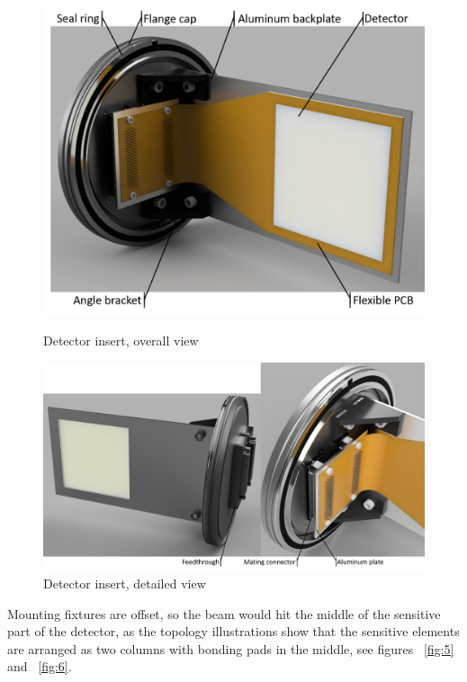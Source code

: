 \documentclass[a4paper]{jpconf}
\begin{document}
\begin{figure}[htbp]
	\begin{minipage}{14pc}
		\includegraphics[width=\textwidth]{detector_insert.png}
		\caption{\label{fig:3} Detector insert, overall view}
	\end{minipage}\hspace{2pc}
	\begin{minipage}{14pc}
		\includegraphics[width=1.5\textwidth]{detector_insert_back.png}
		\caption{\label{fig:4} Detector insert, detailed view}
	\end{minipage} 
\end{figure}

Mounting fixtures are offset, so the beam would hit the middle of the sensitive part of the detector, as the topology illustrations show that the sensitive elements are arranged as two columns with bonding pads in the middle, see figures ~\ref{fig:5} and ~\ref{fig:6}.
\end{document}
